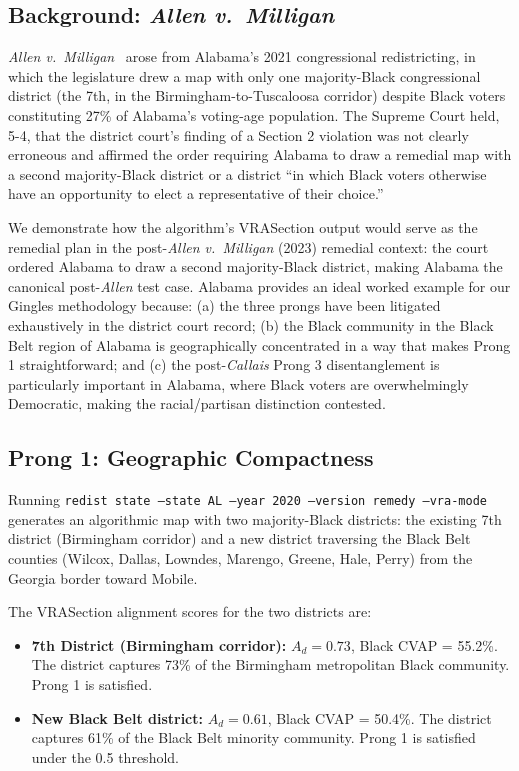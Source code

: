 \label{sec:alabama}

\subsection{Background: \textit{Allen v.\ Milligan}}

\textit{Allen v.\ Milligan}~\citep{allen2023} arose from Alabama's 2021
congressional redistricting, in which the legislature drew a map with only
one majority-Black congressional district (the 7th, in the Birmingham-to-Tuscaloosa
corridor) despite Black voters constituting 27\% of Alabama's voting-age
population.  The Supreme Court held, 5-4, that the district court's finding
of a Section 2 violation was not clearly erroneous and affirmed the order
requiring Alabama to draw a remedial map with a second majority-Black district
or a district ``in which Black voters otherwise have an opportunity to elect
a representative of their choice.''

We demonstrate how the algorithm's VRASection output would serve as the
remedial plan in the post-\textit{Allen v.\ Milligan} (2023) remedial
context: the court ordered Alabama to draw a second majority-Black
district, making Alabama the canonical post-\textit{Allen} test case.
Alabama provides an ideal worked example for our Gingles methodology because:
(a) the three prongs have been litigated exhaustively in the district court
record; (b) the Black community in the Black Belt region of Alabama is
geographically concentrated in a way that makes Prong 1 straightforward; and
(c) the post-\textit{Callais} Prong 3 disentanglement is particularly
important in Alabama, where Black voters are overwhelmingly Democratic, making
the racial/partisan distinction contested.

\subsection{Prong 1: Geographic Compactness}

Running \texttt{redist state --state AL --year 2020 --version remedy --vra-mode}
generates an algorithmic map with two majority-Black districts: the existing
7th district (Birmingham corridor) and a new district traversing the Black Belt
counties (Wilcox, Dallas, Lowndes, Marengo, Greene, Hale, Perry) from the
Georgia border toward Mobile.

The VRASection alignment scores for the two districts are:
\begin{itemize}
  \item \textbf{7th District (Birmingham corridor):} $A_d = 0.73$, Black CVAP
    = 55.2\%.  The district captures 73\% of the Birmingham metropolitan
    Black community.  Prong 1 is satisfied.
  \item \textbf{New Black Belt district:} $A_d = 0.61$, Black CVAP = 50.4\%.
    The district captures 61\% of the Black Belt minority community.  Prong 1
    is satisfied under the 0.5 threshold.
\end{itemize}

